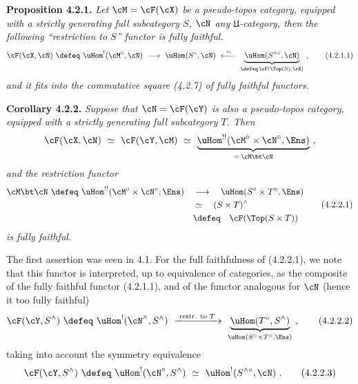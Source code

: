 \textbf{Proposition 4.2.1.} \textit{Let $\cM=\cF(\cX)$ be a pseudo-topos category, equipped with a strictly generating full subcategory $S$, $\cN$ any $\mathfrak{U}$-category, then the following ``restriction to $S$'' functor is fully faithful.}
\[
\cF(\cX,\cN) \ \defeq\ \uHom^{!}(\cM^{\circ},\cN) \ \longrightarrow\ \uHom(S^{\circ},\cN) \ \xleftarrow{\ \sim\ }\ \underbrace{\uHom(S^{\wedge\circ},\cN)}_{\defeq\, \cF(\Top(S),\cN)} \ ,
\tag*{(4.2.1.1)}
\]
\textit{and it fits into the commutative square (4.2.7) of fully faithful functors.}

\textbf{Corollary 4.2.2.} \textit{Suppose that $\cN=\cF(\cY)$ is also a pseudo-topos category, equipped with a strictly generating full subcategory $T$. Then}
\[
\cF(\cX,\cN) \ \simeq\ \cF(\cY,\cM) \ \simeq\ \underbrace{\uHom^{!!}(\cM^{\circ}\times\cN^{\circ},\Ens)}_{=\,\cM\bt\cN} \ ,
\]
\textit{and the restriction functor}
\[
\begin{aligned}
\cM\bt\cN \ \defeq\ \uHom^{!!}(\cM^{\circ}\times\cN^{\circ},\Ens) \quad &\longrightarrow \quad \uHom(S^{\circ}\times T^{\circ},\Ens)\\
&\simeq \quad (S\times T)^{\wedge}\\
&\defeq \quad \cF(\Top(S\times T))
\end{aligned}
\tag*{(4.2.2.1)}
\]
\textit{is fully faithful.}

The first assertion was seen in 4.1. For the full faithfulness of (4.2.2.1), we note that this functor is interpreted, up to equivalence of categories, as the composite of the fully faithful functor (4.2.1.1), and of the functor
analogous for $\cN$ (hence it too fully faithful)
\[
\cF(\cY,S^{\wedge}) \ \defeq\ \uHom^{!}(\cN^{\wedge},S^{\wedge}) \ \xrightarrow{\ \text{restr. to } T\ }\ \underbrace{\uHom(T^{\circ},S^{\wedge})}_{\uHom(S^{\circ}\times T^{\circ},\Ens)} \ ,
\tag*{(4.2.2.2)} %
\]
taking into account the symmetry equivalence
\[
\cF(\cY,S^{\wedge}) \ \defeq\ \uHom^{!}(\cN^{\circ},S^{\wedge}) \ \simeq\ \uHom^{!}(S^{\wedge\circ},\cN) \ .
\tag*{(4.2.2.3)}
\]

